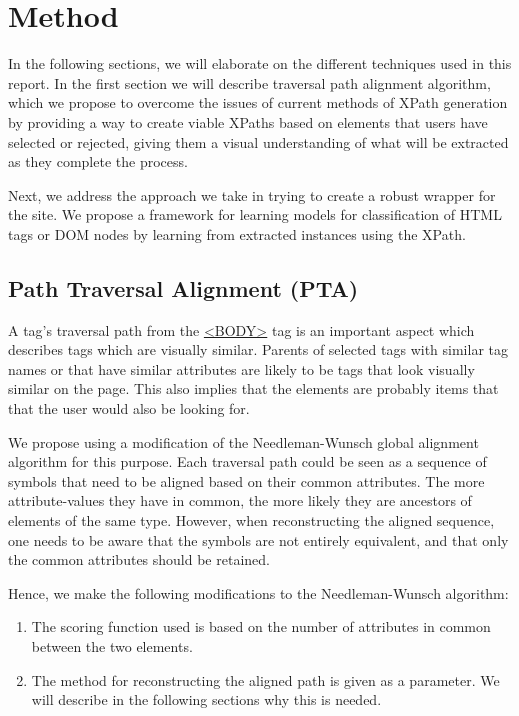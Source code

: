 \section{Method}
\label{chap:method}
In the following sections, we will elaborate on the different techniques used in this report.
In the first section we will describe traversal path alignment algorithm, which we
propose to overcome the issues of current methods of XPath generation by providing
a way to create viable XPaths based on elements that users have selected or rejected,
giving them a visual understanding of what will be extracted as they complete the process.

Next, we address the approach we take in trying to create a robust wrapper for the site.
We propose a framework for learning models for classification of HTML tags or DOM nodes by
learning from extracted instances using the XPath.

\subsection{Path Traversal Alignment (PTA)}
A tag's traversal path from the \url{<BODY>} tag is an important aspect which describes tags which are visually similar.
Parents of selected tags with similar tag names or that have similar
attributes are likely to be tags that look visually similar on the page. This also implies that
 the elements are probably items that that the user would also be looking for.

We propose using a modification of the Needleman-Wunsch \cite{Needleman1970} global alignment algorithm for this
purpose. Each traversal path could be seen as a sequence of symbols that need to be aligned
based on their common attributes. The more attribute-values they have in common, the more
likely they are ancestors of elements of the same type. However, when reconstructing the
aligned sequence, one needs to be aware that the symbols are not entirely equivalent, and that
only the common attributes should be retained.

Hence, we make the following modifications to the Needleman-Wunsch algorithm:
\begin{enumerate}
	\item The scoring function used is based on the number of attributes in common
	between the two elements.
	\item The method for reconstructing the aligned path is given as a parameter. We will
	describe in the following sections why this is needed.
\end{enumerate}

